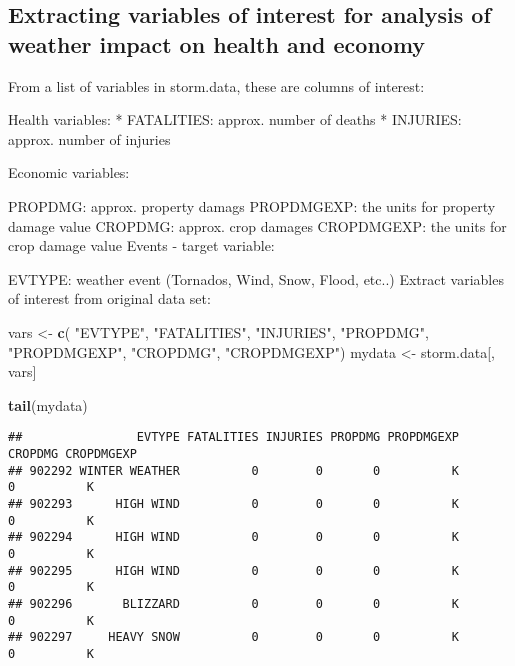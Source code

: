 \documentclass[
]{article}
\newenvironment{Shaded}{\begin{snugshade}}{\end{snugshade}}
\newcommand{\KeywordTok}[1]{\textcolor[rgb]{0.13,0.29,0.53}{\textbf{#1}}}
\newcommand{\NormalTok}[1]{#1}
\newcommand{\StringTok}[1]{\textcolor[rgb]{0.31,0.60,0.02}{#1}}
\begin{document}
\hypertarget{extracting-variables-of-interest-for-analysis-of-weather-impact-on-health-and-economy}{%
\subsection{Extracting variables of interest for analysis of weather
impact on health and
economy}\label{extracting-variables-of-interest-for-analysis-of-weather-impact-on-health-and-economy}}

From a list of variables in storm.data, these are columns of interest:

Health variables: * FATALITIES: approx. number of deaths * INJURIES:
approx. number of injuries

Economic variables:

PROPDMG: approx. property damags PROPDMGEXP: the units for property
damage value CROPDMG: approx. crop damages CROPDMGEXP: the units for
crop damage value Events - target variable:

EVTYPE: weather event (Tornados, Wind, Snow, Flood, etc..) Extract
variables of interest from original data set:

\begin{Shaded}
\begin{Highlighting}[]
\NormalTok{vars <-}\StringTok{ }\KeywordTok{c}\NormalTok{( }\StringTok{"EVTYPE"}\NormalTok{, }\StringTok{"FATALITIES"}\NormalTok{, }\StringTok{"INJURIES"}\NormalTok{, }\StringTok{"PROPDMG"}\NormalTok{, }\StringTok{"PROPDMGEXP"}\NormalTok{, }\StringTok{"CROPDMG"}\NormalTok{, }\StringTok{"CROPDMGEXP"}\NormalTok{)}
\NormalTok{mydata <-}\StringTok{ }\NormalTok{storm.data[, vars]}
\end{Highlighting}
\end{Shaded}

\begin{Shaded}
\begin{Highlighting}[]
\KeywordTok{tail}\NormalTok{(mydata)}
\end{Highlighting}
\end{Shaded}

\begin{verbatim}
##                EVTYPE FATALITIES INJURIES PROPDMG PROPDMGEXP CROPDMG CROPDMGEXP
## 902292 WINTER WEATHER          0        0       0          K       0          K
## 902293      HIGH WIND          0        0       0          K       0          K
## 902294      HIGH WIND          0        0       0          K       0          K
## 902295      HIGH WIND          0        0       0          K       0          K
## 902296       BLIZZARD          0        0       0          K       0          K
## 902297     HEAVY SNOW          0        0       0          K       0          K
\end{verbatim}
\end{document}
